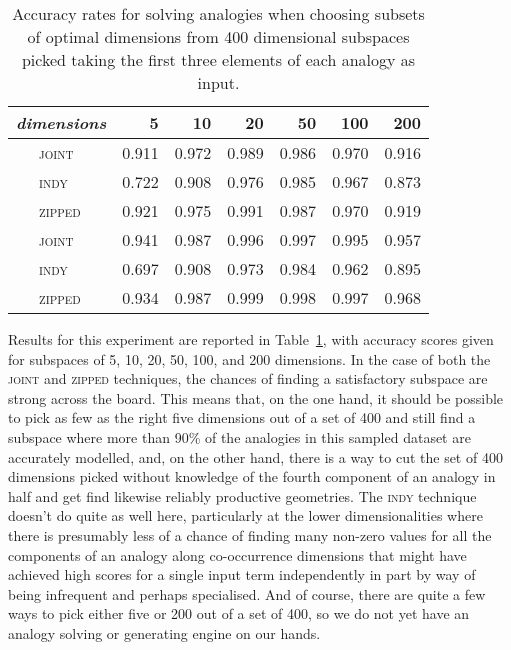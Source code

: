 \begin{table}
\centering
\begin{tabular}{clrrrrrr}
\hline
\multicolumn{2}{l}{\emph{dimensions}} & 5 & 10 & 20 & 50 & 100 & 200 \\
\hline
\parbox[t]{2mm}{} & \textsc{joint} & 0.911 & 0.972 & 0.989 & 0.986 & 0.970 & 0.916 \\
& \textsc{indy} & 0.722 & 0.908 & 0.976 & 0.985 & 0.967 & 0.873 \\
& \textsc{zipped} & 0.921 & 0.975 & 0.991 & 0.987 & 0.970 & 0.919 \\
\hline
\parbox[t]{2mm}{} & \textsc{joint} & 0.941 & 0.987 & 0.996 & 0.997 & 0.995 & 0.957 \\
& \textsc{indy} & 0.697 & 0.908 & 0.973 & 0.984 & 0.962 & 0.895 \\
& \textsc{zipped} & 0.934 & 0.987 & 0.999 & 0.998 & 0.997 & 0.968 \\
\hline
\end{tabular}
\caption[Finding Spaces for Known Analogies]{Accuracy rates for solving analogies when choosing subsets of optimal dimensions from 400 dimensional subspaces picked taking the first three elements of each analogy as input.}
\label{tab:knowns}
\end{table}

Results for this experiment are reported in Table~\ref{tab:knowns}, with accuracy scores given for subspaces of 5, 10, 20, 50, 100, and 200 dimensions.  In the case of both the \textsc{joint} and \textsc{zipped} techniques, the chances of finding a satisfactory subspace are strong across the board.  This means that, on the one hand, it should be possible to pick as few as the right five dimensions out of a set of 400 and still find a subspace where more than 90\% of the analogies in this sampled dataset are accurately modelled, and, on the other hand, there is a way to cut the set of 400 dimensions picked without knowledge of the fourth component of an analogy in half and get find likewise reliably productive geometries.  The \textsc{indy} technique doesn't do quite as well here, particularly at the lower dimensionalities where there is presumably less of a chance of finding many non-zero values for all the components of an analogy along co-occurrence dimensions that might have achieved high scores for a single input term independently in part by way of being infrequent and perhaps specialised.  And of course, there are quite a few ways to pick either five or 200 out of a set of 400, so we do not yet have an analogy solving or generating engine on our hands.

